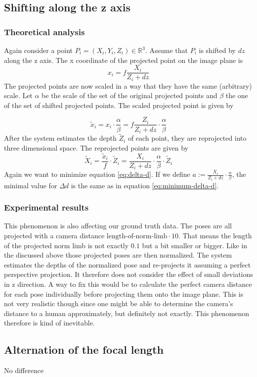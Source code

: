 \subsection{Shifting along the z axis}
\label{sec:z-shift-error}
\subsubsection{Theoretical analysis}
Again consider a point $P_i=(X_i, Y_i, Z_i) \in \mathbb{R}^3$. Assume that $P_i$ is shifted by $dz$ along the z axis.
The x coordinate of the projected point on the image plane is
\begin{equation}
	x_i = f \frac{X_i}{Z_i + dz}
\end{equation}
The projected points are now scaled in a way that they have the same (arbitrary) scale.  Let $\alpha$ be the scale of the set of the original projected points and $\beta$ the one of the set of shifted projected points. The scaled projected point is given by

\begin{equation}
		\widetilde{x}_i = x_i \cdot \frac{\alpha}{\beta} 
		= f \frac{Z_i}{Z_i + dz}\cdot \frac{\alpha}{\beta} 
\end{equation}
After the system estimates the depth $\widetilde{Z}_i$ of each point, they are reprojected into three dimensional space.
The reprojected points are given by
\begin{equation}
	\widetilde{X}_i = \frac{\widetilde{x}_i}{f} \cdot \widetilde{Z}_i
	= \frac{X_i}{Z_i + dz}\cdot \frac{\alpha}{\beta}  \cdot \widetilde{Z}_i
\end{equation}
Again we want to minimize equation \eqref{eq:delta-d}.
If we define $a := \frac{X_i}{Z_i + dz}\cdot \frac{\alpha}{\beta}$, the minimal value for $\Delta d$ is the same as in equation \eqref{eq:minimum-delta-d}.


\subsubsection{Experimental results}

This phenomenon is also affecting our ground truth data. The poses are all projected with a camera distance $ \text{length-of-norm-limb} \cdot 10$. 
That means the length of the projected norm limb is not exactly $0.1$ but a bit smaller or bigger. 
Like in the discussed above those projected poses are then normalized. 
The system estimates the depths of the normalized pose and re-projects it assuming a perfect perspective projection. 
It therefore does not consider the effect of small deviations in z direction.
A way to fix this would be to calculate the perfect camera distance for each pose individually before projecting them onto the image plane.
This is not very realistic though since one might be able to determine the camera's distance to a human approximately, but definitely not exactly. This phenomenon therefore is kind of inevitable.


\subsection{Alternation of the focal length}
No difference

